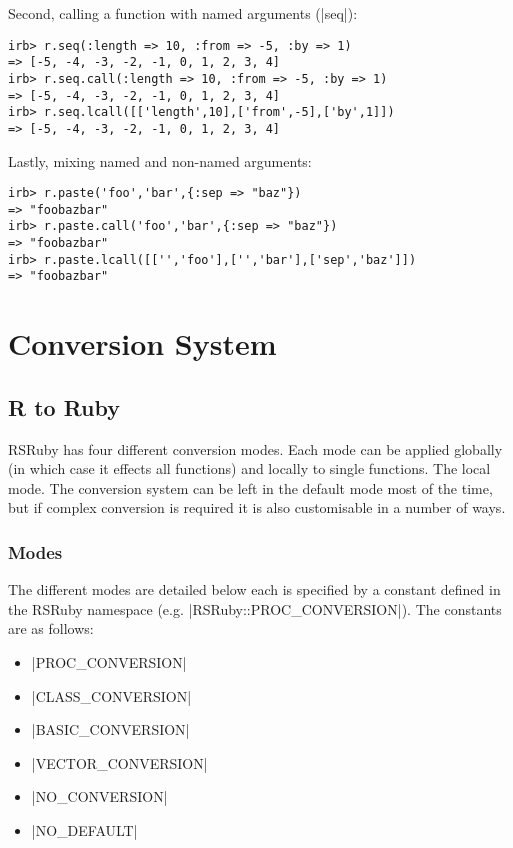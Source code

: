 \documentclass[a4paper,12pt]{book}
\begin{document}
Second, calling a function with named arguments (|seq|):

\begin{Verbatim}
irb> r.seq(:length => 10, :from => -5, :by => 1)
=> [-5, -4, -3, -2, -1, 0, 1, 2, 3, 4]
irb> r.seq.call(:length => 10, :from => -5, :by => 1)
=> [-5, -4, -3, -2, -1, 0, 1, 2, 3, 4]
irb> r.seq.lcall([['length',10],['from',-5],['by',1]])
=> [-5, -4, -3, -2, -1, 0, 1, 2, 3, 4]
\end{Verbatim}

Lastly, mixing named and non-named arguments:

\begin{Verbatim}
irb> r.paste('foo','bar',{:sep => "baz"})
=> "foobazbar"
irb> r.paste.call('foo','bar',{:sep => "baz"})
=> "foobazbar"
irb> r.paste.lcall([['','foo'],['','bar'],['sep','baz']])
=> "foobazbar"
\end{Verbatim}

\chapter{Conversion System}\label{conversion_system}

\section{R to Ruby}

RSRuby has four different conversion modes. Each mode can be applied globally (in which case it effects all functions) and locally to single functions. The local mode. The conversion system can be left in the default mode most of the time, but if complex conversion is required it is also customisable in a number of ways.

\subsection{Modes}

The different modes are detailed below each is specified by a constant defined in the RSRuby namespace (e.g. |RSRuby::PROC_CONVERSION|). The constants are as follows:

\begin{itemize}
\item |PROC_CONVERSION|
\item |CLASS_CONVERSION|
\item |BASIC_CONVERSION|
\item |VECTOR_CONVERSION|
\item |NO_CONVERSION|
\item |NO_DEFAULT|
\end{itemize}
\end{document}
